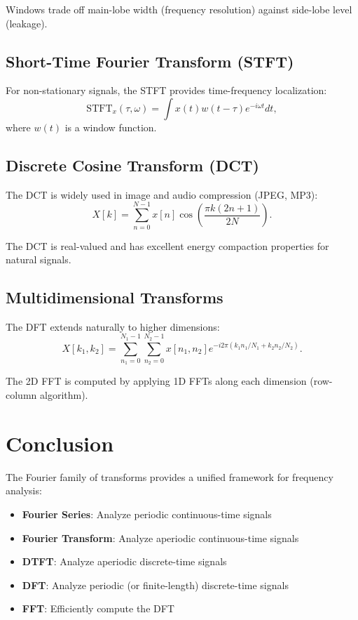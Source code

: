 \begin{notechapter}
Windows trade off main-lobe width (frequency resolution) against side-lobe level (leakage).

\subsection{Short-Time Fourier Transform (STFT)}

For non-stationary signals, the STFT provides time-frequency localization:
\[
\text{STFT}_x(\tau, \omega) = \int x(t) w(t - \tau) e^{-i\omega t} dt,
\]
where $w(t)$ is a window function.

\subsection{Discrete Cosine Transform (DCT)}

The DCT is widely used in image and audio compression (JPEG, MP3):
\[
X[k] = \sum_{n=0}^{N-1} x[n] \cos\left(\frac{\pi k(2n+1)}{2N}\right).
\]

The DCT is real-valued and has excellent energy compaction properties for natural signals.

\subsection{Multidimensional Transforms}

The DFT extends naturally to higher dimensions:
\[
X[k_1, k_2] = \sum_{n_1=0}^{N_1-1} \sum_{n_2=0}^{N_2-1} x[n_1, n_2] e^{-i2\pi(k_1 n_1/N_1 + k_2 n_2/N_2)}.
\]

The 2D FFT is computed by applying 1D FFTs along each dimension (row-column algorithm).

\section{Conclusion}

The Fourier family of transforms provides a unified framework for frequency analysis:

\begin{itemize}
\item \textbf{Fourier Series}: Analyze periodic continuous-time signals
\item \textbf{Fourier Transform}: Analyze aperiodic continuous-time signals
\item \textbf{DTFT}: Analyze aperiodic discrete-time signals
\item \textbf{DFT}: Analyze periodic (or finite-length) discrete-time signals
\item \textbf{FFT}: Efficiently compute the DFT
\end{itemize}


\end{notechapter}
